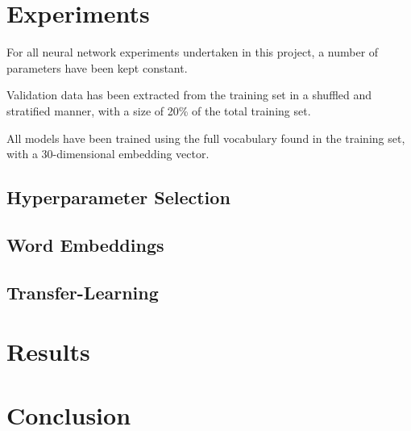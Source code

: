 \documentclass[12pt]{article}
\begin{document}
\section{Experiments}


For all neural network experiments undertaken in this project, a number of parameters have been kept constant.

Validation data has been extracted from the training set in a shuffled and stratified manner, with a size of 20\% of the total training set.

All models have been trained using the full vocabulary found in the training set, with a 30-dimensional embedding vector. 





\subsection{Hyperparameter Selection}

\subsection{Word Embeddings}

\subsection{Transfer-Learning}

\section{Results}

\section{Conclusion}

\printbibliography
\end{document}
